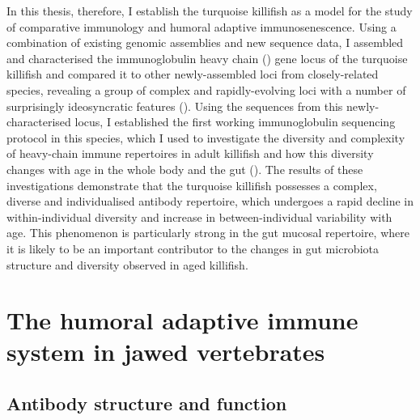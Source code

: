 In this thesis, therefore, I establish the turquoise killifish as a model for the study of comparative immunology and humoral adaptive immunosenescence. Using a combination of existing genomic assemblies and new sequence data, I assembled and characterised the immunoglobulin heavy chain (\igh{}) gene locus of the turquoise killifish and compared it to other newly-assembled loci from closely-related species, revealing a group of complex and rapidly-evolving loci with a number of surprisingly ideosyncratic features (). Using the sequences from this newly-characterised locus, I established the first working immunoglobulin sequencing protocol in this species, which I used to investigate the diversity and complexity of heavy-chain immune repertoires in adult killifish and how this diversity changes with age in the whole body and the gut (). The results of these investigations demonstrate that the turquoise killifish possesses a complex, diverse and individualised antibody repertoire, which undergoes a rapid decline in within-individual diversity and increase in between-individual variability with age. This phenomenon is particularly strong in the gut mucosal repertoire, where it is likely to be an important contributor to the changes in gut microbiota structure and diversity observed in aged killifish. 


\section{The humoral adaptive immune system in jawed vertebrates}

\subsection{Antibody structure and function}
\label{sec:intro_antibody_structure}

